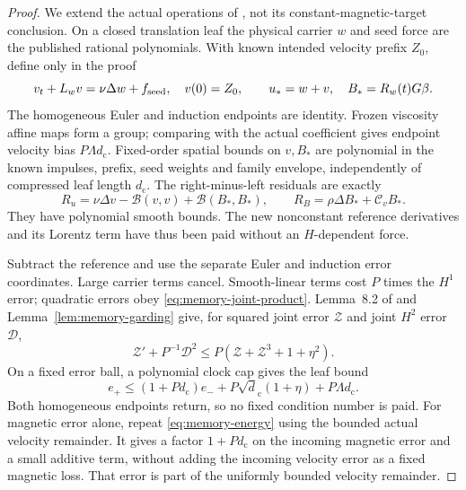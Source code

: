 \documentclass[11pt,a4paper]{amsart}
\theoremstyle{definition}
\theoremstyle{remark}
\numberwithin{equation}{section}
\newcommand{\Bcal}{\mathcal B}
\newcommand{\Ccal}{\mathcal C}
\begin{document}
\begin{proof}
We extend the actual operations of \cite[Sections~8.3--8.5,
Proposition~8.3]{Common}, not its constant-magnetic-target conclusion.
On a closed translation leaf the physical carrier $w$ and seed force
are the published rational polynomials.  With known intended velocity
prefix $Z_0$, define only in the proof
\[
 v_t+L_wv=\nu\Delta w+f_{\rm seed},\quad v(0)=Z_0,
 \qquad u_*=w+v,\quad B_*=R_w(t)G\beta.
\]
The homogeneous Euler and induction endpoints are identity.  Frozen
viscosity affine maps form a group; comparing with the actual coefficient
gives endpoint velocity bias $P\Lambda d_{\mathrm c}$.  Fixed-order spatial bounds
on $v,B_*$ are polynomial in the known impulses, prefix, seed weights
and family envelope, independently of compressed leaf length $d_{\mathrm c}$.
The right-minus-left residuals are exactly
\begin{equation}\label{eq:memory-writer-sources}
 R_u=\nu\Delta v-\Bcal(v,v)+\Bcal(B_*,B_*),\qquad
 R_B=\rho\Delta B_*+\Ccal_vB_*.
\end{equation}
They have polynomial smooth bounds.  The new nonconstant reference
derivatives and its Lorentz term have thus been paid without an
$H$-dependent force.

Subtract the reference and use the separate Euler and induction error
coordinates.  Large carrier terms cancel.  Smooth-linear terms cost
$P$ times the $H^1$ error; quadratic errors obey
\eqref{eq:memory-joint-product}.  Lemma~8.2 of \cite{Common} and
Lemma~\ref{lem:memory-garding} give, for squared joint error $\mathcal Z$
and joint $H^2$ error $\mathcal D$,
\begin{equation}\label{eq:memory-writer-energy}
 \mathcal Z'+P^{-1}\mathcal D^2
           \le P(\mathcal Z+\mathcal Z^3+1+\eta^2).
\end{equation}
On a fixed error ball, a polynomial clock cap gives the leaf bound
\begin{equation}\label{eq:memory-writer-leaf}
 e_+\le(1+Pd_{\mathrm c})e_-+P\sqrt d_{\mathrm c}(1+\eta)+P\Lambda d_{\mathrm c}.
\end{equation}
Both homogeneous endpoints return, so no fixed condition number is paid.
For magnetic error alone, repeat \eqref{eq:memory-energy} using the
bounded actual velocity remainder.  It gives a factor $1+Pd_{\mathrm c}$ on the
incoming magnetic error and a small additive term, without adding the
incoming velocity error as a fixed magnetic loss.  That error is part
of the uniformly bounded velocity remainder.


\end{proof}
\end{document}
